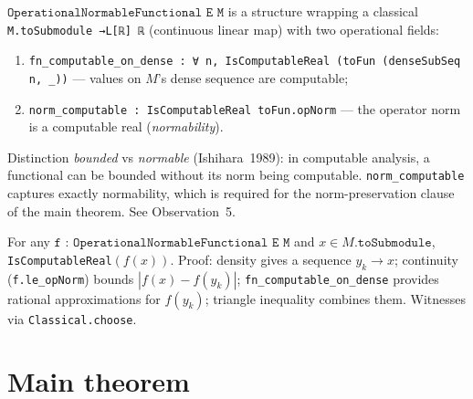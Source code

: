\begin{definition}
\label{def:OperationalNormableFunctional}
\leanok
{}
$\texttt{OperationalNormableFunctional~E~M}$ is a structure wrapping
a classical \texttt{M.toSubmodule →L[ℝ] ℝ} (continuous linear map)
with two operational fields:
\begin{enumerate}
\item \texttt{fn\_computable\_on\_dense : ∀ n, IsComputableReal
  (toFun (denseSubSeq n, \_))} --- values on $M$'s dense sequence
  are computable;
\item \texttt{norm\_computable : IsComputableReal toFun.opNorm} ---
  the operator norm is a computable real (\emph{normability}).
\end{enumerate}
Distinction \emph{bounded} vs \emph{normable} (Ishihara~1989): in
computable analysis, a functional can be bounded without its norm being
computable.  \texttt{norm\_computable} captures exactly normability,
which is required for the norm-preservation clause of the main theorem.
See Observation~5.
\end{definition}

\begin{theorem}
\label{thm:fn_computable_everywhere}
\leanok
{}
For any $\texttt{f : OperationalNormableFunctional~E~M}$ and
$x \in M.\texttt{toSubmodule}$, \texttt{IsComputableReal}$(f(x))$.
Proof: density gives a sequence $y_k \to x$; continuity
(\texttt{f.le\_opNorm}) bounds $|f(x) - f(y_k)|$;
\texttt{fn\_computable\_on\_dense} provides rational approximations
for $f(y_k)$; triangle inequality combines them.  Witnesses via
\texttt{Classical.choose}.
\end{theorem}

\section{Main theorem}
\label{sec:audit_main}

